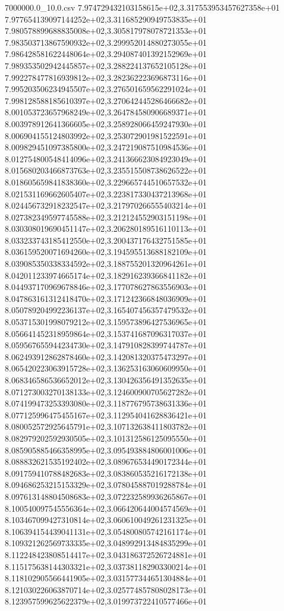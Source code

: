 \begin{filecontents*}{7000000.0_10.0.csv}
7.974729432103158615e+02,3.317553953457627358e+01
7.977654139097144252e+02,3.311685290949753835e+01
7.980578899688835008e+02,3.305817978078721353e+01
7.983503713867590932e+02,3.299952014880273055e+01
7.986428581622448064e+02,3.294087401392152969e+01
7.989353502942445857e+02,3.288224137652105128e+01
7.992278477816939812e+02,3.282362223696873116e+01
7.995203506234945507e+02,3.276501659562291024e+01
7.998128588185610397e+02,3.270642445286466682e+01
8.001053723657968249e+02,3.264784580906689371e+01
8.003978912641366605e+02,3.258928066459247930e+01
8.006904155124803992e+02,3.253072901981522591e+01
8.009829451097385800e+02,3.247219087510984536e+01
8.012754800548414096e+02,3.241366623084923049e+01
8.015680203466873763e+02,3.235515508738626522e+01
8.018605659841838360e+02,3.229665744510657532e+01
8.021531169662605407e+02,3.223817330437213968e+01
8.024456732918232547e+02,3.217970266555403214e+01
8.027382349597745588e+02,3.212124552903151198e+01
8.030308019690451147e+02,3.206280189516110113e+01
8.033233743185412550e+02,3.200437176432751585e+01
8.036159520071694260e+02,3.194595513688182109e+01
8.039085350338334592e+02,3.188755201320964261e+01
8.042011233974665174e+02,3.182916239366841182e+01
8.044937170969678846e+02,3.177078627863556903e+01
8.047863161312418470e+02,3.171242366848036909e+01
8.050789204992236137e+02,3.165407456357479532e+01
8.053715301998079212e+02,3.159573896427536965e+01
8.056641452318959864e+02,3.153741687096317037e+01
8.059567655944234730e+02,3.147910828399744787e+01
8.062493912862878460e+02,3.142081320375473297e+01
8.065420223063915728e+02,3.136253163060609950e+01
8.068346586536652012e+02,3.130426356491352635e+01
8.071273003270138133e+02,3.124600900705627282e+01
8.074199473253393080e+02,3.118776795738631336e+01
8.077125996475455167e+02,3.112954041628836421e+01
8.080052572925645791e+02,3.107132638411803782e+01
8.082979202592930505e+02,3.101312586125095550e+01
8.085905885466358995e+02,3.095493884806001006e+01
8.088832621535192402e+02,3.089676534490172344e+01
8.091759410788482683e+02,3.083860535216172138e+01
8.094686253215153329e+02,3.078045887019288784e+01
8.097613148804508683e+02,3.072232589936265867e+01
8.100540097545556364e+02,3.066420644004574569e+01
8.103467099427310814e+02,3.060610049261231325e+01
8.106394154439041131e+02,3.054800805742161174e+01
8.109321262569733335e+02,3.048992913484835299e+01
8.112248423808514417e+02,3.043186372526724881e+01
8.115175638144303321e+02,3.037381182903300214e+01
8.118102905566441905e+02,3.031577344651304884e+01
8.121030226063870714e+02,3.025774857808028173e+01
8.123957599625622379e+02,3.019973722410577466e+01

\end{filecontents*}

